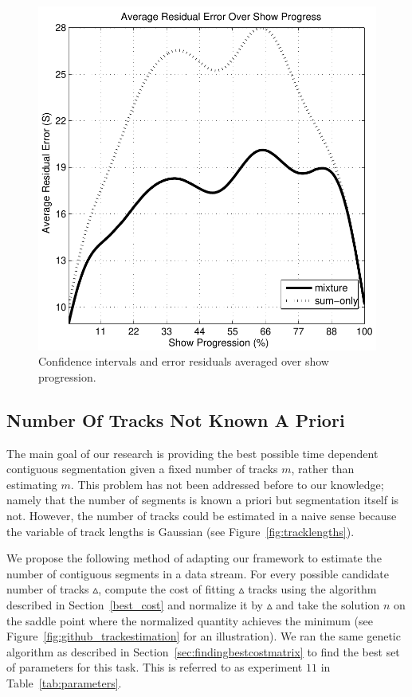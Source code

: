 \documentclass[twocolumn]{article}
\begin{document}
\begin{figure}
	\includegraphics[scale=0.4]{images/conf/residualsagainstprogress}
	
	\caption{Confidence intervals and error residuals averaged over show progression.}
	\label{fig:confidence_intervals}
	
\end{figure}


\subsection{Number Of Tracks Not Known A Priori}\label{sec:trackcount}

The main goal of our research is providing the best possible time dependent contiguous segmentation given a fixed number of tracks $m$, rather than estimating $m$. This problem has not been addressed before to our knowledge; namely that the number of segments is known a priori but segmentation itself is not. However, the number of tracks could be estimated in a naive sense because the variable of track lengths is Gaussian (see Figure~\ref{fig:tracklengths}). 


We propose the following method of adapting our framework to estimate the number of contiguous segments in a data stream. For every possible candidate number of tracks $\vartriangle$, compute the cost of fitting $\vartriangle$ tracks using the algorithm described in Section~\ref{best_cost} and normalize it by $\vartriangle$ and take the solution $n$ on the saddle point where the normalized quantity achieves the minimum (see Figure~\ref{fig:github_trackestimation} for an illustration). We ran the same genetic algorithm as described in Section~\ref{sec:findingbestcostmatrix} to find the best set of parameters for this task. This is referred to as experiment $11$ in Table~\ref{tab:parameters}.
\end{document}
